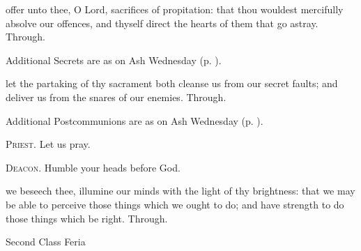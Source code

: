 \secret
{} offer unto thee, O Lord, sacrifices of propitation: that thou wouldest mercifully absolve our offences, and thyself direct the hearts of them that go astray. Through.
\begin{rubric}
    Additional Secrets are as on Ash Wednesday (p. \pageref{AshWednesdayMass}).
\end{rubric}
\postcommunion
{} let the partaking of thy sacrament both cleanse us from our secret faults; and deliver us from the snares of our enemies. Through.

\begin{rubric}
    Additional Postcommunions are as on Ash Wednesday (p. \pageref{AshWednesdayMass}).
\end{rubric}

\textsc{Priest.} Let us pray.\par
\textsc{Deacon.} Humble your heads before God.\par
{} we beseech thee, illumine our minds with the light of thy brightness: that we may be able to perceive those things which we ought to do; and have strength to do those things which be right. Through.


\begin{inhead}
{Second Class Feria}
\end{inhead}
\par\noindent
{}

